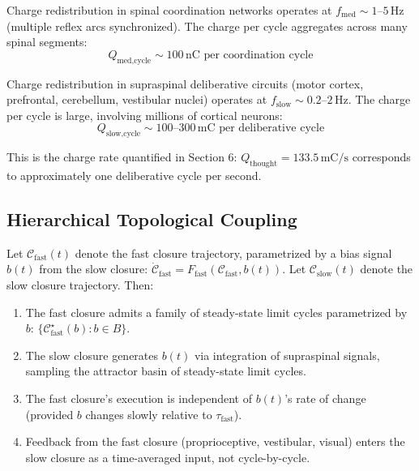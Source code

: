\begin{definition}
Charge redistribution in spinal coordination networks operates at $f_{\text{med}} \sim 1\text{--}5\,\text{Hz}$ (multiple reflex arcs synchronized). The charge per cycle aggregates across many spinal segments:
\begin{equation}
Q_{\text{med,cycle}} \sim 100\,\text{nC per coordination cycle}
\end{equation}
\end{definition}

\begin{definition}
Charge redistribution in supraspinal deliberative circuits (motor cortex, prefrontal, cerebellum, vestibular nuclei) operates at $f_{\text{slow}} \sim 0.2\text{--}2\,\text{Hz}$. The charge per cycle is large, involving millions of cortical neurons:
\begin{equation}
Q_{\text{slow,cycle}} \sim 100\text{--}300\,\text{mC per deliberative cycle}
\end{equation}

This is the charge rate quantified in Section 6: $Q_{\text{thought}} = 133.5\,\text{mC/s}$ corresponds to approximately one deliberative cycle per second.
\end{definition}

\subsection{Hierarchical Topological Coupling}

\begin{theorem}
\label{thm:nested-closure}
Let $\mathcal{C}_{\text{fast}}(t)$ denote the fast closure trajectory, parametrized by a bias signal $b(t)$ from the slow closure: $\dot{\mathcal{C}}_{\text{fast}} = F_{\text{fast}}(\mathcal{C}_{\text{fast}}, b(t))$. Let $\mathcal{C}_{\text{slow}}(t)$ denote the slow closure trajectory. Then:

\begin{enumerate}[label=(\alph*),leftmargin=*,itemsep=1pt]
\item The fast closure admits a family of steady-state limit cycles parametrized by $b$: $\{\mathcal{C}_{\text{fast}}^{\star}(b) : b \in B\}$.
\item The slow closure generates $b(t)$ via integration of supraspinal signals, sampling the attractor basin of steady-state limit cycles.
\item The fast closure's execution is independent of $b(t)$'s rate of change (provided $b$ changes slowly relative to $\tau_{\text{fast}}$).
\item Feedback from the fast closure (proprioceptive, vestibular, visual) enters the slow closure as a time-averaged input, not cycle-by-cycle.
\end{enumerate}
\end{theorem}

